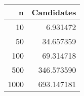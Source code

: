 \begin{tabular}{rr}
\toprule
n & Candidates \\
\midrule
10 & 6.931472 \\
50 & 34.657359 \\
100 & 69.314718 \\
500 & 346.573590 \\
1000 & 693.147181 \\
\bottomrule
\end{tabular}
